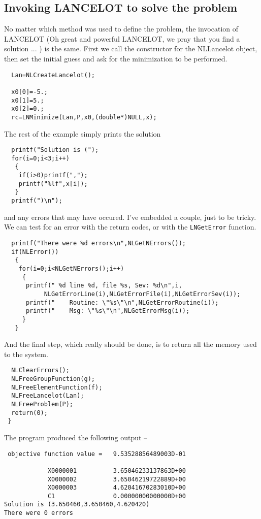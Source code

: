 \documentclass[12pt]{article}
\begin{document}
  \subsection{Invoking LANCELOT to solve the problem}
  No matter which method was used to define the problem, the invocation of LANCELOT
  (Oh great and powerful LANCELOT, we pray that you find a solution ... ) is the same.
  First we call the constructor for the NLLancelot object, then set the initial guess
  and ask for the minimization to be performed.
\begin{verbatim}
  Lan=NLCreateLancelot();

  x0[0]=-5.;
  x0[1]=5.;
  x0[2]=0.;
  rc=LNMinimize(Lan,P,x0,(double*)NULL,x);
\end{verbatim}
  The rest of the example simply prints the solution 
\begin{verbatim}
  printf("Solution is (");
  for(i=0;i<3;i++)
   {
    if(i>0)printf(",");
    printf("%lf",x[i]);
   }
  printf(")\n");
\end{verbatim}
  and any errors that may have occured. I've embedded a couple, just to
  be tricky. We can test for an error with the return codes, or with the
  {\tt LNGetError} function.
\begin{verbatim}
  printf("There were %d errors\n",NLGetNErrors());
  if(NLError())
   {
    for(i=0;i<NLGetNErrors();i++)
     {
      printf(" %d line %d, file %s, Sev: %d\n",i,
           NLGetErrorLine(i),NLGetErrorFile(i),NLGetErrorSev(i));
      printf("    Routine: \"%s\"\n",NLGetErrorRoutine(i));
      printf("    Msg: \"%s\"\n",NLGetErrorMsg(i));
     }
   }
\end{verbatim}
  And the final step, which really should be done, is to return all the
  memory used to the system.
\begin{verbatim}
  NLClearErrors();
  NLFreeGroupFunction(g);
  NLFreeElementFunction(f);
  NLFreeLancelot(Lan);
  NLFreeProblem(P);
  return(0);
 }
\end{verbatim}

The program produced the following output --
\begin{verbatim}
 objective function value =   9.53528856489003D-01

            X0000001          3.65046233137863D+00
            X0000002          3.65046219722889D+00
            X0000003          4.62041670283010D+00
            C1                0.00000000000000D+00
Solution is (3.650460,3.650460,4.620420)
There were 0 errors
\end{verbatim}
\end{document}
